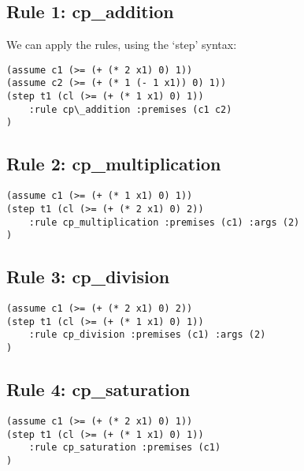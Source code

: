 \documentclass[12pt]{article}
\begin{document}
\subsection{Rule 1: cp\_addition}
We can apply the rules, using the `step' syntax:

\begin{verbatim}
(assume c1 (>= (+ (* 2 x1) 0) 1))
(assume c2 (>= (+ (* 1 (- 1 x1)) 0) 1))
(step t1 (cl (>= (+ (* 1 x1) 0) 1))
    :rule cp\_addition :premises (c1 c2)
)
\end{verbatim}

\subsection{Rule 2: cp\_multiplication}
\begin{verbatim}
(assume c1 (>= (+ (* 1 x1) 0) 1))
(step t1 (cl (>= (+ (* 2 x1) 0) 2))
    :rule cp_multiplication :premises (c1) :args (2)
)
\end{verbatim}

\subsection{Rule 3: cp\_division}
\begin{verbatim}
(assume c1 (>= (+ (* 2 x1) 0) 2))
(step t1 (cl (>= (+ (* 1 x1) 0) 1))
    :rule cp_division :premises (c1) :args (2)
)
\end{verbatim}

\subsection{Rule 4: cp\_saturation}
\begin{verbatim}
(assume c1 (>= (+ (* 2 x1) 0) 1))
(step t1 (cl (>= (+ (* 1 x1) 0) 1))
    :rule cp_saturation :premises (c1)
)
\end{verbatim}


\end{document}
